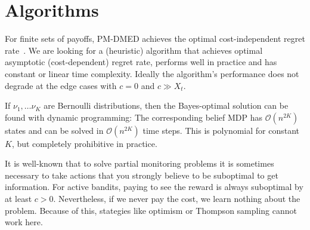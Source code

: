 \documentclass[a4paper]{article}
\begin{document}
\section{Algorithms}

For finite sets of payoffs,
PM-DMED achieves the optimal cost-independent regret rate~\citep{Komiyama15}.
We are looking for a (heuristic) algorithm that achieves optimal asymptotic (cost-dependent) regret rate,
performs well in practice and has constant or linear time complexity.
Ideally the algorithm's performance does not degrade at the edge cases with $c = 0$ and $c \gg X_t$.

If $\nu_1, \ldots \nu_K$ are Bernoulli distributions,
then the Bayes-optimal solution
can be found with dynamic programming:
The corresponding belief MDP has $\mathcal{O}(n^{2K})$ states
and can be solved in $\mathcal{O}(n^{2K})$ time steps.
This is polynomial for constant $K$,
but completely prohibitive in practice.

It is well-known that to solve partial monitoring problems
it is sometimes necessary to take actions that you strongly believe to be suboptimal to get information.
For active bandits, paying to see the reward is always suboptimal
by at least $c > 0$.
Nevertheless, if we never pay the cost, we learn nothing about the problem.
Because of this, stategies like optimism or Thompson sampling cannot work here.
\end{document}
